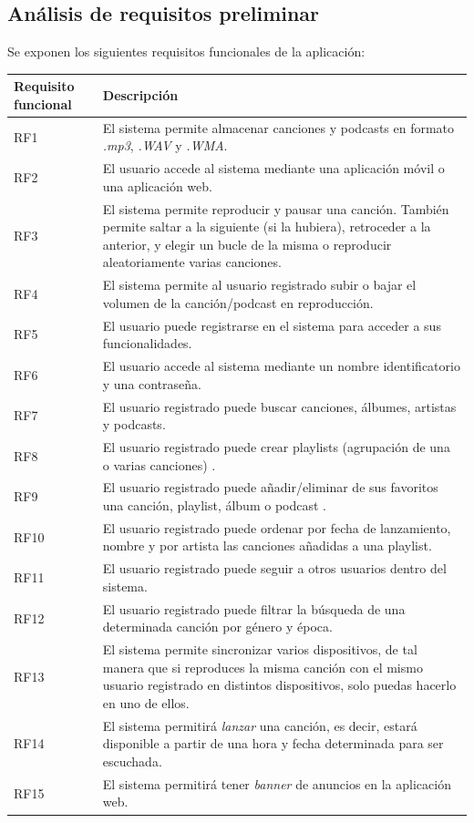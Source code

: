 \documentclass{article}
\begin{document}
\subsection{Análisis de requisitos preliminar}
Se exponen los siguientes requisitos funcionales de la aplicación:
\break
\begin{table}[H]
	\begin{tabular}{p{4cm} p{10cm}}
		\hline
		\hline 
		\textbf{Requisito funcional}
		\vspace{0.5mm} & \textbf{Descripción} \\ 
		\hline
		\hline
		RF1
		& El sistema permite almacenar canciones y podcasts en formato \textit{.mp3}, \textit{.WAV} y \textit{.WMA}. \\ 
		\hline 
		RF2
		& El usuario accede al sistema mediante una aplicación móvil o una aplicación web. \\ 
		\hline
		RF3
		& El sistema permite reproducir y pausar una canción. También permite saltar a la siguiente (si la hubiera), retroceder a la anterior, y elegir un bucle de la misma o reproducir aleatoriamente varias canciones. \\ 
		\hline
		RF4
		& El sistema permite al usuario registrado subir o bajar el volumen de la canción/podcast en reproducción. \\ 
		\hline
		RF5
		& El usuario puede registrarse en el sistema para acceder a sus funcionalidades. \\ 
		\hline
		RF6
		& El usuario accede al sistema mediante un nombre identificatorio y una contraseña. \\ 
		\hline
		RF7
		& El usuario registrado puede buscar canciones, álbumes, artistas y podcasts. \\ 
		\hline
		RF8
		& El usuario registrado puede crear playlists (agrupación de una o varias canciones) . \\ 
		\hline
		RF9
		& El usuario registrado puede añadir/eliminar de sus favoritos una canción, playlist, álbum o podcast . \\ 
		\hline
		RF10
		& El usuario registrado puede ordenar por fecha de lanzamiento, nombre y por artista las canciones añadidas a una playlist. \\ 
		\hline
		RF11 
		&  El usuario registrado puede seguir a otros usuarios dentro del sistema.\\
		\hline
		RF12 
		&  El usuario registrado puede filtrar la búsqueda de una determinada canción por género y época.\\
		\hline
		RF13
		&  El sistema permite sincronizar varios dispositivos, de tal manera que si reproduces la misma canción con el mismo usuario registrado en distintos dispositivos, solo puedas hacerlo en uno de ellos.\\
		\hline
		RF14
		&  El sistema permitirá \textit{lanzar} una canción, es decir, estará disponible a partir de una hora y fecha determinada para ser escuchada.\\
		\hline
		RF15
		&  El sistema permitirá tener \textit{banner} de anuncios en la aplicación web.\\
		\hline
	\end{tabular}
\end{table}
\end{document}
